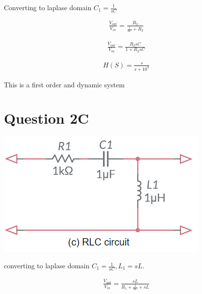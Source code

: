 \documentclass{article}
\begin{document}
Converting to laplase domain
$
    C_1 = \frac{1}{sC}
$

\begin{equation*}
    \begin{aligned}
        \frac{V_{out}}{V_{in}} = \frac{R_2}{\frac{1}{sC} + R_2}
    \end{aligned}
\end{equation*}

\begin{equation*}
    \begin{aligned}
        \frac{V_{out}}{V_{in}} = \frac{R_2 sC}{1 + R_2 sC}
    \end{aligned}
\end{equation*}

\begin{equation*}
    \begin{aligned}
        H(S) = \frac{s}{s + 10^3}
    \end{aligned}
\end{equation*}

This is a first order and dynamic system


\section{Question 2C}
\begin{center}
    \includegraphics[scale=0.7]{2c.png}

\end{center}

converting to laplase domain
$
    C_1 = \frac{1}{sC}, L_1 = sL
$.

\begin{equation*}
    \begin{aligned}
        \frac{V_{out}}{V_{in}} = \frac{sL}{R_1 + \frac{1}{sC} + sL}
    \end{aligned}
\end{equation*}
\end{document}
